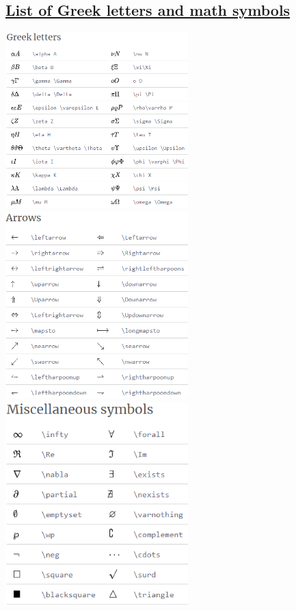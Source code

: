 \documentclass[10 pt]{book}
\begin{document}
\begin{enumerate}
\section{\href{https://www.overleaf.com/learn/latex/List_of_Greek_letters_and_math_symbols}{List of Greek letters and math symbols}}
\begin{center}
	\includegraphics[width=200pt]{Greek Letters.png} 
	\includegraphics[width=200pt]{Arrows.png}
	\includegraphics[width=200pt]{Miscellaneous symbols.png}

\end{center}
\end{enumerate}
\end{document}

